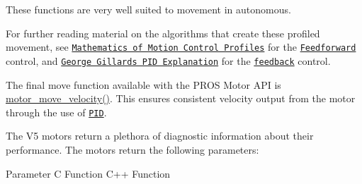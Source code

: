 These functions are very well suited to movement in autonomous.

For further reading material on the algorithms that create these profiled movement, see \href{https://pdfs.semanticscholar.org/a229/fdba63d8d68abd09f70604d56cc07ee50f7d.pdf}{\tt Mathematics of Motion Control Profiles} for the \href{https://en.wikipedia.org/wiki/Feed_forward_(control)}{\tt Feedforward} control, and \href{http://georgegillard.com/documents/2-introduction-to-pid-controllers}{\tt George Gillard\textquotesingle{}s P\+ID Explanation} for the \href{https://en.wikipedia.org/wiki/Control_theory#PID_feedback_control}{\tt feedback} control.

The final {\ttfamily move} function available with the P\+R\+OS Motor A\+PI is {\ttfamily \hyperlink{motors_8h_a5a366399c1ff416002641fd05e6d7808}{motor\+\_\+move\+\_\+velocity()}}. This ensures consistent velocity output from the motor through the use of \href{http://georgegillard.com/documents/2-introduction-to-pid-controllers}{\tt P\+ID}.

The V5 motors return a plethora of diagnostic information about their performance. The motors return the following parameters\+:

Parameter C Function C++ Function 



